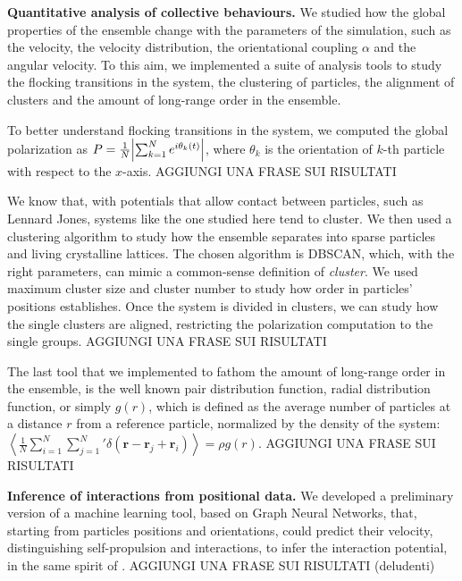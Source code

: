 \documentclass[a4paper, notitlepage]{report} %
\begin{document}
	\textbf{Quantitative analysis of collective behaviours.}
	We studied how the global properties of the ensemble change with the parameters of the simulation, such as the velocity, the velocity distribution, the orientational coupling $\alpha$ and the angular velocity.
	To this aim, we implemented a suite of analysis tools to study the flocking transitions in the system, the clustering of particles, the alignment of clusters and the amount of long-range order in the ensemble.

	To better understand flocking transitions in the system, we computed the global polarization as $P = \frac{1}{N} \abs{\sum_{k=1}^{N} e^{i \theta_k(t)}}$, where $\theta_k$ is the orientation of $k$-th particle with respect to the $x$-axis.
	AGGIUNGI UNA FRASE SUI RISULTATI

	We know that, with potentials that allow contact between particles, such as Lennard Jones, systems like the one studied here tend to cluster.
	We then used a clustering algorithm to study how the ensemble separates into sparse particles and living crystalline lattices.
	The chosen algorithm is DBSCAN, which, with the right parameters, can mimic a common-sense definition of \emph{cluster}.
	We used maximum cluster size and cluster number to study how order in particles' positions establishes.
	Once the system is divided in clusters, we can study how the single clusters are aligned, restricting the polarization computation to the single groups.
	AGGIUNGI UNA FRASE SUI RISULTATI

	The last tool that we implemented to fathom the amount of long-range order in the ensemble, is the well known pair distribution function, radial distribution function, or simply $g(r)$, which is defined \cite{hansen90a} as the average number of particles at a distance $r$ from a reference particle, normalized by the density of the system:
	$\left\langle \frac{1}{N} \sum_{i=1}^{N} \sum_{j=1}^{N}{}' \delta (\mathbf{r} - \mathbf{r}_j + \mathbf{r}_i) \right\rangle = \rho g(r)$.
	AGGIUNGI UNA FRASE SUI RISULTATI
	
	
	\textbf{Inference of interactions from positional data.} 
	We developed a preliminary version of a machine learning tool, based on Graph Neural Networks, that, starting from particles positions and orientations, could predict their velocity, distinguishing self-propulsion and interactions, to infer the interaction potential, in the same spirit of \cite{ruiz-garcia_discovering_2024}.
	AGGIUNGI UNA FRASE SUI RISULTATI (deludenti)
\end{document}
